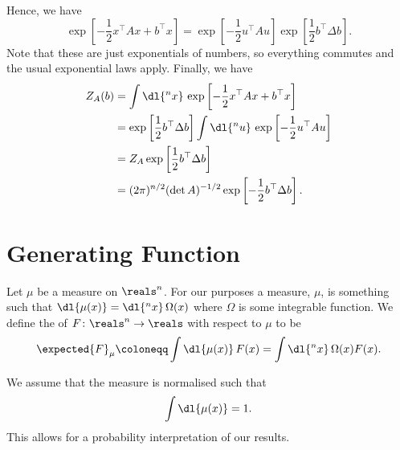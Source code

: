 \documentclass[fleqn]{NotesClass}
\newcommand{\trans}{{\top}}
\begin{document}
    Hence, we have
    \begin{equation}
        \exp\left[ -\frac{1}{2}x^\trans A x + b^\trans x \right] = \exp[-\frac{1}{2} u^\trans A u] \exp\left[ \frac{1}{2} b^\trans \Delta b \right].
    \end{equation}
    Note that these are just exponentials of numbers, so everything commutes and the usual exponential laws apply.
    Finally, we have
    \begin{align}
        Z_A(b) &= \int \dl{^nx} \, \exp\left[ -\frac{1}{2}x^\trans A x + b^\trans x \right]\\
        &= \exp\left[ \frac{1}{2}b^\trans \Delta b \right] \int \dl{^nu} \, \exp\left[ -\frac{1}{2}u^\trans A u \right]\\
        &= Z_A\exp\left[ \frac{1}{2}b^\trans \Delta b \right]\\
        &= (2\pi)^{n/2} (\det A)^{-1/2} \exp\left[ -\frac{1}{2}b^\trans \Delta b \right].
    \end{align}
    
    \section{Generating Function}
    Let \(\mu\) be a measure on \(\reals^n\).
    For our purposes a measure, \(\mu\), is something such that \(\dl{\mu(x)} = \dl{^nx}\, \Omega(x)\) where \(\Omega\) is some integrable function.
    We define the  of \(F \colon \reals^n \to \reals\) with respect to \(\mu\) to be
    \begin{equation}
        \expected{F}_\mu \coloneqq \int \dl{\mu(x)} \, F(x) = \int \dl{^nx} \, \Omega(x) F(x).
    \end{equation}
    
    We assume that the measure is normalised such that
    \begin{equation}
        \int \dl{\mu(x)} = 1.
    \end{equation}
    This allows for a probability interpretation of our results.
    
\end{document}
